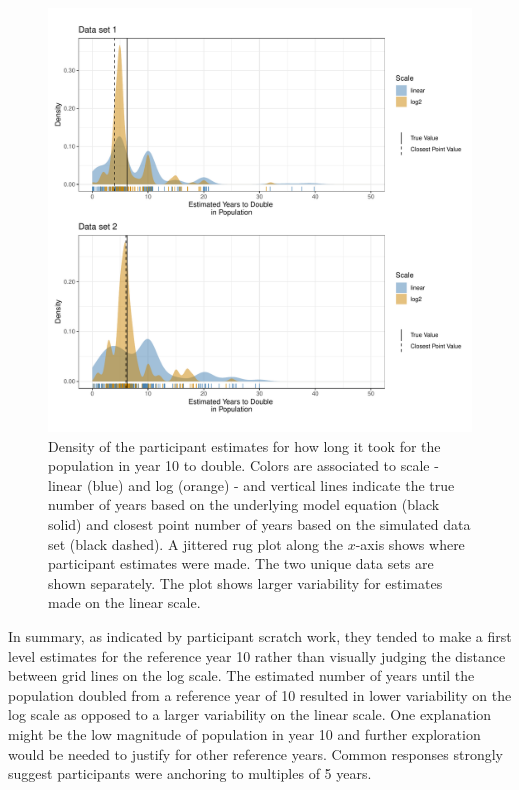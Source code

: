 \documentclass[print]{nuthesis}
\begin{document}
\begin{figure}[tbp]

{\centering \includegraphics[width=1\linewidth,]{thesis_files/figure-latex/qi3-density-1} 

}

\caption[Intermediate Q3 density]{Density of the participant estimates for how long it took for the population in year 10 to double. Colors are associated to scale - linear (blue) and log (orange) - and vertical lines indicate the true number of years based on the underlying model equation (black solid) and closest point number of years based on the simulated data set (black dashed). A jittered rug plot along the $x$-axis shows where participant estimates were made. The two unique data sets are shown separately. The plot shows larger variability for estimates made on the linear scale.}\label{fig:qi3-density}
\end{figure}

In summary, as indicated by participant scratch work, they tended to make a first level estimates for the reference year 10 rather than visually judging the distance between grid lines on the log scale.
The estimated number of years until the population doubled from a reference year of 10 resulted in lower variability on the log scale as opposed to a larger variability on the linear scale.
One explanation might be the low magnitude of population in year 10 and further exploration would be needed to justify for other reference years.
Common responses strongly suggest participants were anchoring to multiples of 5 years.
\end{document}
